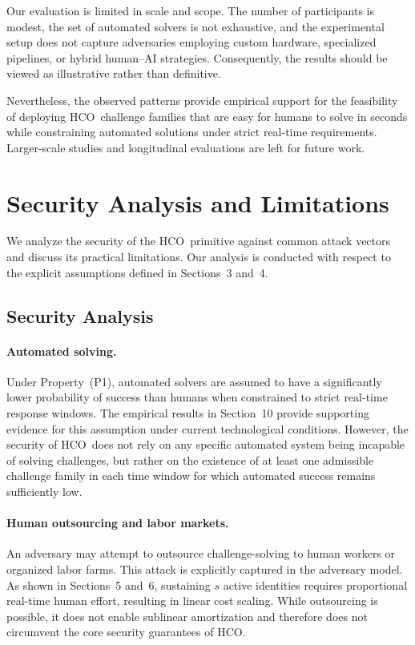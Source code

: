\documentclass[11pt]{article}
\newcommand{\HCO}{HCO\xspace}
\begin{document}
Our evaluation is limited in scale and scope. The number of participants is modest, the set of automated solvers is not exhaustive, and the experimental setup does not capture adversaries employing custom hardware, specialized pipelines, or hybrid human--AI strategies. Consequently, the results should be viewed as illustrative rather than definitive.

Nevertheless, the observed patterns provide empirical support for the feasibility of deploying \HCO\ challenge families that are easy for humans to solve in seconds while constraining automated solutions under strict real-time requirements. Larger-scale studies and longitudinal evaluations are left for future work.

	
\section{Security Analysis and Limitations}
\label{sec:limitations}


We analyze the security of the \HCO\ primitive against common attack vectors and discuss its practical limitations. Our analysis is conducted with respect to the explicit assumptions defined in Sections~3 and~4.

\subsection{Security Analysis}

\paragraph{Automated solving.}
Under Property~(P1), automated solvers are assumed to have a significantly lower probability of success than humans when constrained to strict real-time response windows. The empirical results in Section~10 provide supporting evidence for this assumption under current technological conditions. However, the security of \HCO\ does not rely on any specific automated system being incapable of solving challenges, but rather on the existence of at least one admissible challenge family in each time window for which automated success remains sufficiently low.

\paragraph{Human outsourcing and labor markets.}
An adversary may attempt to outsource challenge-solving to human workers or organized labor farms. This attack is explicitly captured in the adversary model. As shown in Sections~5 and~6, sustaining $s$ active identities requires proportional real-time human effort, resulting in linear cost scaling. While outsourcing is possible, it does not enable sublinear amortization and therefore does not circumvent the core security guarantees of \HCO.
\end{document}
